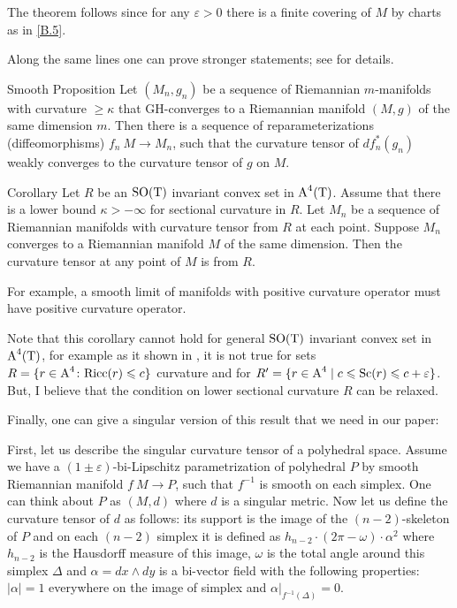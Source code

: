 \documentclass{article}
\begin{document}
The theorem follows since for any $\varepsilon>0$ there is a finite covering of $M$ by charts as in \ref{B.5}.
\qeds


Along the same lines one can prove stronger statements; see \cite{LP} for details.

\begin{thm}{Smooth Proposition} Let $(M_n,g_n)$ be a sequence of
Riemannian $m$-manifolds with curvature $\ge \kappa$ that
GH-converges to a Riemannian manifold $(M,g)$ of the same
dimension $m$.
Then there is a sequence of reparameterizations (diffeomorphisms) $f_n\:M\to M_n$, such that the curvature tensor of $df_n^*(g_n)$ weakly converges to the curvature tensor of $g$ on $M$.
\end{thm}


\begin{thm}{Corollary} Let $R$ be an $\text{\rm SO}(\text{\rm T})$ invariant convex set in $\text{\rm A}^4(\text{\rm T})$. Assume
that there is a lower bound $\kappa>-\infty$ for sectional curvature in $R$.
Let $M_n$ be a sequence of Riemannian manifolds with curvature tensor from $R$ at each point.
Suppose $M_n$ converges to a Riemannian manifold $M$ of the same dimension.
Then the curvature tensor at any point of $M$ is from $R$.
\end{thm}


For example, a smooth limit of manifolds with positive curvature operator must have positive curvature operator.

Note that this corollary cannot hold for general
$\text{\rm SO}(\text{\rm T})$ invariant convex set in $\text{\rm A}^4(\text{\rm T})$, for example as it shown in \cite{Loh-GLC}, \cite{Loh-SCH} it is not true for sets $R=\{r\z\in
\A^4\:\Ricc(r)\le c\}$ curvature and for $R'=\{r\in \text{\rm A}^4\mid c\leqslant
\mathrm{Sc}(r)\leqslant c+\varepsilon\}$.
But, I believe that the condition on lower sectional curvature $R$ can be relaxed.

Finally, one can give a singular version of this result that we need in our paper:

First, let us describe the singular curvature tensor of a polyhedral space. 
Assume
we have a $(1\pm\varepsilon)$-bi-Lipschitz parametrization of polyhedral $P$
by smooth
Riemannian manifold $f\:M\to P$, such that $f^{-1}$ is smooth on each simplex.
One can think about $P$ as $(M,d)$ where $d$ is a singular metric.
Now let us define the curvature tensor of $d$ as follows: its support is the image of the $(n-2)$-skeleton of $P$ and on each $(n-2)$ simplex it is defined as $h_{n-2}\cdot (2\pi-\omega)\cdot\alpha^2$ where $h_{n-2}$ is the Hausdorff
measure of this image, $\omega$ is the total angle around this simplex $\Delta$ and $\alpha=dx\wedge dy$ is a bi-vector field with the following properties: $|\alpha|=1$ everywhere on the image of simplex and $\alpha|_{f^{-1}(\Delta)}=0$.
\end{document}
